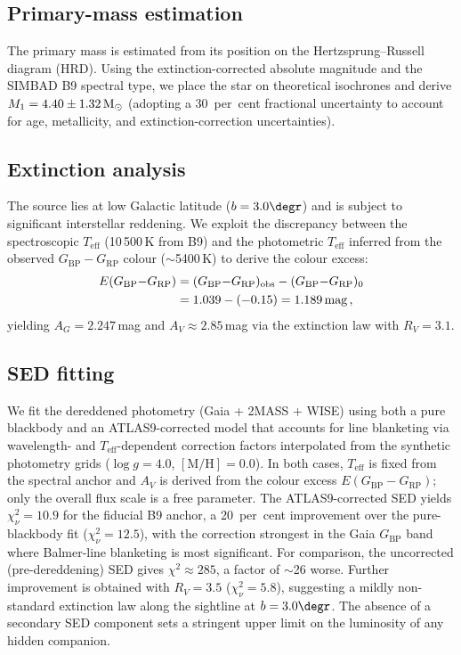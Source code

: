 \documentclass[usenatbib,fleqn]{mnras}
\newcommand{\Msun}{{\rm M}_\odot}
\begin{document}
\subsection{Primary-mass estimation}
\label{sec:methods:m1}

The primary mass is estimated from its position on the
Hertzsprung--Russell diagram (HRD).  Using the extinction-corrected
absolute magnitude and the SIMBAD B9 spectral type, we place the
star on theoretical isochrones and derive
$M_1 = 4.40 \pm 1.32\,\Msun$ (adopting a 30~per~cent fractional
uncertainty to account for age, metallicity, and
extinction-correction uncertainties).

\subsection{Extinction analysis}
\label{sec:methods:extinction}

The source lies at low Galactic latitude ($b = 3.0\degr$) and is
subject to significant interstellar reddening.  We exploit the
discrepancy between the spectroscopic $T_\mathrm{eff}$ (10\,500\,K
from B9) and the photometric $T_\mathrm{eff}$ inferred from the
observed $G_\mathrm{BP} - G_\mathrm{RP}$ colour ($\sim$5400\,K) to
derive the colour excess:
\begin{align}
E(G_\mathrm{BP} {-} G_\mathrm{RP})
  &= (G_\mathrm{BP} {-} G_\mathrm{RP})_\mathrm{obs}
     - (G_\mathrm{BP} {-} G_\mathrm{RP})_0 \notag\\
  &= 1.039 - (-0.15) = 1.189\,\text{mag}\,,
\end{align}
yielding $A_G = 2.247$\,mag and $A_V \approx 2.85$\,mag
via the \citet{Cardelli1989} extinction law with $R_V = 3.1$.

\subsection{SED fitting}
\label{sec:methods:sed}

We fit the dereddened photometry (Gaia + 2MASS + WISE) using both a
pure blackbody and an ATLAS9-corrected model that accounts for line
blanketing via wavelength- and $T_\mathrm{eff}$-dependent correction
factors interpolated from the \citet{CastelliKurucz2004} synthetic
photometry grids ($\log g = 4.0$, $[\text{M/H}] = 0.0$).  In both
cases, $T_\mathrm{eff}$ is fixed from the spectral anchor and $A_V$
is derived from the colour excess $E(G_\mathrm{BP} - G_\mathrm{RP})$;
only the overall flux scale is a free parameter.  The
ATLAS9-corrected SED yields $\chi^2_\nu = 10.9$ for the fiducial B9
anchor, a 20~per~cent improvement over the pure-blackbody fit
($\chi^2_\nu = 12.5$), with the correction strongest in the Gaia
$G_\mathrm{BP}$ band where Balmer-line blanketing is most
significant.  For comparison, the uncorrected (pre-dereddening)
SED gives $\chi^2 \approx 285$, a factor of $\sim$26 worse.
Further improvement is obtained with $R_V = 3.5$
($\chi^2_\nu = 5.8$), suggesting a mildly non-standard extinction
law along the sightline at $b = 3.0\degr$.  The absence of a
secondary SED component sets a stringent upper limit on the
luminosity of any hidden companion.
\end{document}
